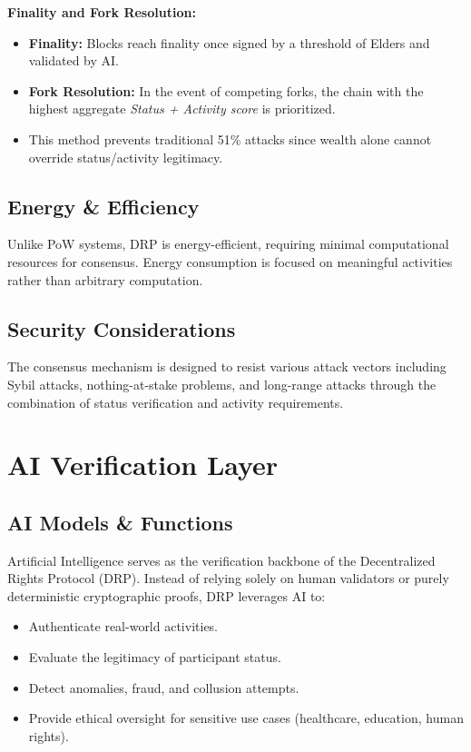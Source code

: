 \documentclass[11pt,a4paper]{article}
\begin{document}
\textbf{Finality and Fork Resolution:}
\begin{itemize}
    \item \textbf{Finality:} Blocks reach finality once signed by a threshold of Elders and validated by AI.
    \item \textbf{Fork Resolution:} In the event of competing forks, the chain with the highest aggregate \textit{Status + Activity score} is prioritized.
    \item This method prevents traditional 51\% attacks since wealth alone cannot override status/activity legitimacy.
\end{itemize}

\subsection{Energy \& Efficiency}
Unlike PoW systems, DRP is energy-efficient, requiring minimal computational resources for consensus. Energy consumption is focused on meaningful activities rather than arbitrary computation.

\subsection{Security Considerations}
The consensus mechanism is designed to resist various attack vectors including Sybil attacks, nothing-at-stake problems, and long-range attacks through the combination of status verification and activity requirements.


\section{AI Verification Layer}

\subsection{AI Models \& Functions}
Artificial Intelligence serves as the verification backbone of the Decentralized Rights Protocol (DRP). Instead of relying solely on human validators or purely deterministic cryptographic proofs, DRP leverages AI to:
\begin{itemize}
    \item Authenticate real-world activities.
    \item Evaluate the legitimacy of participant status.
    \item Detect anomalies, fraud, and collusion attempts.
    \item Provide ethical oversight for sensitive use cases (healthcare, education, human rights).
\end{itemize}
\end{document}
